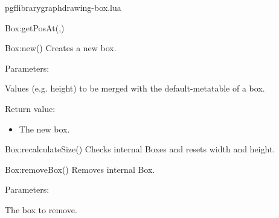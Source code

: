 \begin{filedescription}{pgflibrarygraphdrawing-box.lua}
\begin{luacommand}{{Box:getPosAt}(,)}
\end{luacommand}\begin{luacommand}{{Box:new}()}
Creates a new box.

Parameters:
\begin{parameterdescription}
	\item[\meta{values}] Values (e.g. height) to be merged with the default-metatable of a box.
\end{parameterdescription}


Return value:
\begin{itemize} \item[] The new box. \end{itemize}


\end{luacommand}\begin{luacommand}{{Box:recalculateSize}()}
Checks internal Boxes and resets width and height.



\end{luacommand}\begin{luacommand}{{Box:removeBox}()}
Removes internal Box.

Parameters:
\begin{parameterdescription}
	\item[\meta{box}] The box to remove.
\end{parameterdescription}



\end{luacommand}
\end{filedescription}